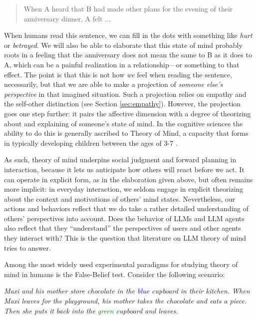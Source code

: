 \begin{quotation}
     \noindent When A heard that B had made other plans for the evening of their anniversary dinner, A felt ...
\end{quotation}

\noindent When humans read this sentence, we can fill in the dots with something like {\em hurt} or {\em betrayed}. We will also be able to elaborate that this state of mind probably roots in a feeling that the anniversary does not mean the same to B as it does to A, which can be a painful realization in a relationship---or something to that effect. The point is that this is not how \textit{we} feel when reading the sentence, necessarily, but that we are able to make a projection of \emph{someone else's perspective} in that imagined situation. Such a projection relies on empathy and the self-other distinction  (see Section \ref{sec:empathy}). However, the projection  goes one step further: it pairs the affective dimension with a degree of theorizing about and explaining of someone's state of mind. In the cognitive sciences the ability to do this is generally ascribed to Theory of Mind, a capacity that forms in typically developing children between the ages of 3-7 \citep{apperly2011mindreaders}.

As such, theory of mind underpins social judgment and forward planning in interaction, because it lets us anticipate how others will react before we act. It can operate in explicit form, as in the elaboration given above, but often remains more implicit: in everyday interaction, we seldom engage in explicit theorizing about the context and motivations of others' mind states. Nevertheless, our actions and behaviors reflect that we do take a rather detailed understanding of others' perspectives into account. Does the behavior of LLMs and LLM agents also reflect that they ``understand'' the perspectives of users and other agents they interact with? This is the question that literature on LLM theory of mind tries to answer.

Among the most widely used experimental paradigms for studying theory of mind in humans is the False-Belief test. Consider the following scenario:

\begin{tcolorbox}[
    colback=white,
    arc=4pt,
    boxrule=0.5pt,
]
\small\textit{Maxi and his mother store chocolate in the \textcolor{blue}{blue} cupboard in their kitchen. When Maxi leaves for the playground, his mother takes the chocolate and eats a piece. Then she puts it back into the \textcolor{green}{green} cupboard and leaves.}
\end{tcolorbox}

